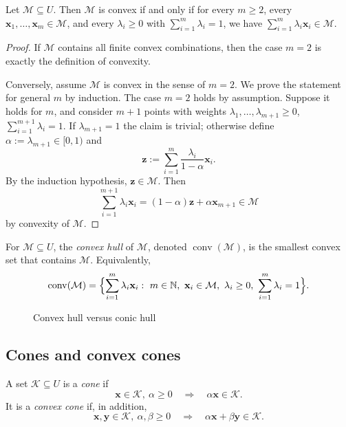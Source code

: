 \begin{claim}
Let $\mathcal{M}\subseteq U$. Then $\mathcal{M}$ is convex if and only if for every $m\ge 2$,
every $\mathbf{x}_1,\ldots,\mathbf{x}_m\in\mathcal{M}$, and every $\lambda_i\ge 0$ with $\sum_{i=1}^m\lambda_i=1$,
we have $\sum_{i=1}^m \lambda_i \mathbf{x}_i\in\mathcal{M}$.
\end{claim}
\begin{proof}
If $\mathcal{M}$ contains all finite convex combinations, then the case $m=2$ is exactly the definition of convexity.

Conversely, assume $\mathcal{M}$ is convex in the sense of $m=2$. We prove the statement for general $m$ by induction.
The case $m=2$ holds by assumption. Suppose it holds for $m$, and consider $m+1$ points with weights
$\lambda_1,\ldots,\lambda_{m+1}\ge 0$, $\sum_{i=1}^{m+1}\lambda_i=1$.
If $\lambda_{m+1}=1$ the claim is trivial; otherwise define $\alpha:=\lambda_{m+1}\in[0,1)$ and
\[
  \mathbf{z}:=\sum_{i=1}^{m}\frac{\lambda_i}{1-\alpha}\mathbf{x}_i.
\]
By the induction hypothesis, $\mathbf{z}\in\mathcal{M}$. Then
\[
  \sum_{i=1}^{m+1}\lambda_i\mathbf{x}_i=(1-\alpha)\mathbf{z}+\alpha \mathbf{x}_{m+1}\in\mathcal{M}
\]
by convexity of $\mathcal{M}$.
\end{proof}

\begin{definition}
For $\mathcal{M}\subseteq U$, the \emph{convex hull} of $\mathcal{M}$, denoted $\operatorname{conv}(\mathcal{M})$,
is the smallest convex set that contains $\mathcal{M}$.
Equivalently,
\[
  \operatorname{conv}(\mathcal{M})
  =\Bigl\{\sum_{i=1}^m \lambda_i \mathbf{x}_i:\ m\in\mathbb{N},\ \mathbf{x}_i\in\mathcal{M},\ \lambda_i\ge 0,\ \sum_{i=1}^m \lambda_i=1\Bigr\}.
\]
\end{definition}

\begin{figure}[ht]
    \centering
    \caption{Convex hull versus conic hull}
    \label{fig:conv-cone-hull}
\end{figure}

\subsection{Cones and convex cones}
\begin{definition}
A set $\mathcal{K}\subseteq U$ is a \emph{cone} if
\[
  \mathbf{x}\in\mathcal{K},\ \alpha\ge 0\quad\Longrightarrow\quad \alpha\mathbf{x}\in\mathcal{K}.
\]
It is a \emph{convex cone} if, in addition,
\[
  \mathbf{x},\mathbf{y}\in\mathcal{K},\ \alpha,\beta\ge 0\quad\Longrightarrow\quad \alpha\mathbf{x}+\beta\mathbf{y}\in\mathcal{K}.
\]
\end{definition}

